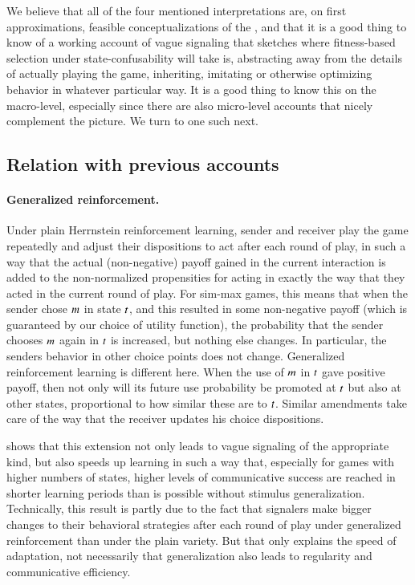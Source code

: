 We believe that all of the four mentioned interpretations are, on
first approximations, feasible conceptualizations of the \rdd, and
that it is a good thing to know of a working account of vague
signaling that sketches where fitness-based selection under
state-confusability will take is, abstracting away from the details of
actually playing the game, inheriting, imitating or otherwise
optimizing behavior in whatever particular way. It is a good thing to
know this on the macro-level, especially since there are also
micro-level accounts that nicely complement the picture. We turn to
one such next.


\subsection{Relation with previous accounts}
\label{sec:relat-with-prev}

\paragraph{Generalized reinforcement.}

Under plain Herrnstein reinforcement learning, sender and receiver
play the game repeatedly and adjust their dispositions to act after
each round of play, in such a way that the actual (non-negative)
payoff gained in the current interaction is added to the
non-normalized propensities for acting in exactly the way that they
acted in the current round of play. For sim-max games, this means that
when the sender chose $m$ in state $t$, and this resulted in
some non-negative payoff (which is guaranteed by our choice of utility
function), the probability that the sender chooses $m$ again in
$t$ is increased, but nothing else changes. In particular, the
senders behavior in other choice points does not change. Generalized
reinforcement learning is different here. When the use of $m$ in
$t$ gave positive payoff, then not only will its future use
probability be promoted at $t$ but also at other states,
proportional to how similar these are to $t$. Similar amendments
take care of the way that the receiver updates his choice
dispositions.

\citet{OConnor2013:The-Evolution-o} shows that this extension not only
leads to vague signaling of the appropriate kind, but also speeds up
learning in such a way that, especially for games with higher numbers
of states, higher levels of communicative success are reached in
shorter learning periods than is possible without stimulus
generalization. Technically, this result is partly due to the fact
that signalers make bigger changes to their behavioral strategies
after each round of play under generalized reinforcement than under
the plain variety. But that only explains the speed of adaptation, not
necessarily that generalization also leads to regularity and
communicative efficiency. 

